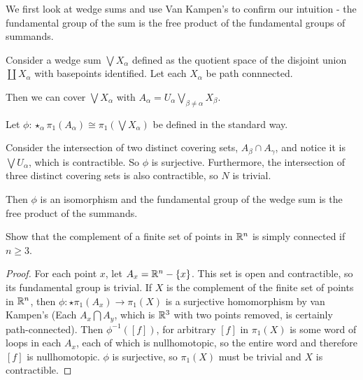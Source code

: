 \documentclass[10pt]{article}
\begin{document}
\begin{note}
We first look at wedge sums and use Van Kampen's to confirm our intuition -
the fundamental group of the sum is the free product of the fundamental groups
of summands.

Consider a wedge sum $\bigvee X_{\alpha}$ defined as the quotient space of the
disjoint union $\coprod X_{\alpha}$ with basepoints identified. Let each
$X_{\alpha}$ be path connnected.

Then we can cover $\bigvee X_{\alpha}$ with $A_{\alpha} = U_{\alpha}
\bigvee_{\beta \neq \alpha} X_{\beta}$.

Let $\phi: \star_{\alpha} \pi_1(A_{\alpha}) \cong \pi_1(\bigvee X_{\alpha})$ be
defined in the standard way.

Consider the intersection of two distinct covering sets, $A_{\beta} \cap
A_{\gamma}$, and notice it is $\bigvee U_{\alpha}$, which is contractible. So
$\phi$ is surjective. Furthermore, the intersection of three distinct covering sets is also
contractible, so $N$ is trivial.

Then $\phi$ is an isomorphism and the fundamental group of the wedge sum is the
free product of the summands.
\end{note}

\begin{exercise}[1.2.3]
	Show that the complement of a finite set of points in $\mathbb{R}^n$ is simply
	connected if $n \geq 3$.
\end{exercise}
\begin{proof}
	For each point $x$, let $A_x = \mathbb{R}^n - \{x\}$. This set is open and
	contractible, so its fundamental group is trivial. If $X$ is the complement
	of the finite set of points in $\mathbb{R}^n$, then $\phi: \star \pi_1(A_x) \to
	\pi_1(X)$ is a surjective homomorphism by van Kampen's (Each $A_x \bigcap
	A_y$, which is $\mathbb{R}^3$ with two points removed, is certainly path-connected). Then $\phi^{-1}([f])$, for arbitrary $[f]$ in
	$\pi_1(X)$ is some word of loops in each $A_x$, each of which is
	nullhomotopic, so the entire word and therefore $[f]$ is nullhomotopic.
	$\phi$ is surjective, so $\pi_1(X)$ must be trivial and $X$ is contractible.
\end{proof}
\end{document}
